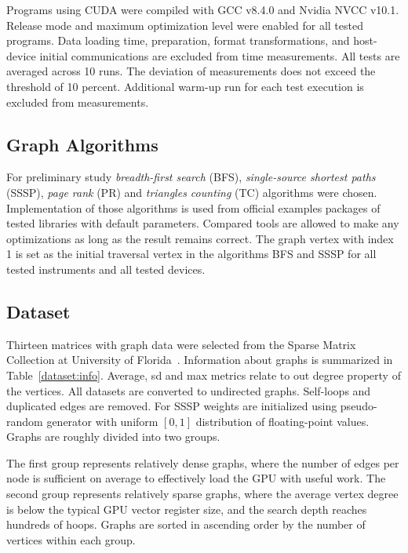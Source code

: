 Programs using CUDA were compiled with GCC v8.4.0 and Nvidia NVCC v10.1.
Release mode and maximum optimization level were enabled for all tested programs. 
Data loading time, preparation, format transformations, and host-device initial communications are excluded from time measurements. 
All tests are averaged across 10 runs. The deviation of measurements does not exceed the threshold of 10 percent. Additional warm-up run for each test execution is excluded from measurements.

\subsection{Graph Algorithms}

For preliminary study \textit{breadth-first search} (BFS), \textit{single-source shortest paths} (SSSP), \textit{page rank} (PR) and \textit{triangles counting} (TC) algorithms were chosen.
Implementation of those algorithms is used from official examples packages of tested libraries with default parameters. Compared tools are allowed to make any optimizations as long as the result remains correct.
The graph vertex with index 1 is set as the initial traversal vertex in the algorithms BFS and SSSP for all tested instruments and all tested devices.

\subsection{Dataset}

Thirteen matrices with graph data were selected from the Sparse Matrix Collection at University of Florida~\cite{dataset:10.1145/2049662.2049663}. 
Information about graphs is summarized in Table~\ref{dataset:info}.
Average, sd and max metrics relate to out degree property of the vertices. 
All datasets are converted to undirected graphs. 
Self-loops and duplicated edges are removed. For SSSP weights are initialized using pseudo-random generator with uniform $[0, 1]$ distribution of floating-point values.
Graphs are roughly divided into two groups. 

The first group represents relatively dense graphs, where the number of edges per node is sufficient on average to effectively load the GPU with useful work. 
The second group represents relatively sparse graphs, where the average vertex degree is below the typical GPU vector register size, and the search depth reaches hundreds of hoops. 
Graphs are sorted in ascending order by the number of vertices within each group.

